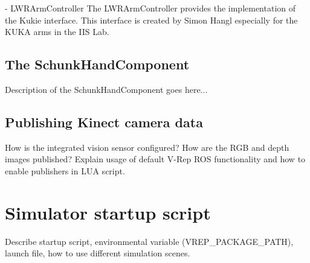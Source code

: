- LWRArmController
  The LWRArmController provides the implementation of the Kukie interface. This interface is created
  by Simon Hangl especially for the KUKA arms in the IIS Lab.

\subsection{The SchunkHandComponent}

Description of the SchunkHandComponent goes here...

\subsection{Publishing Kinect camera data}

How is the integrated vision sensor configured? How are the RGB and depth images published? Explain usage of default V-Rep ROS functionality and how to enable publishers in LUA script.

\section{Simulator startup script}

Describe startup script, environmental variable (VREP\_PACKAGE\_PATH), launch file, how to use different simulation scenes.
